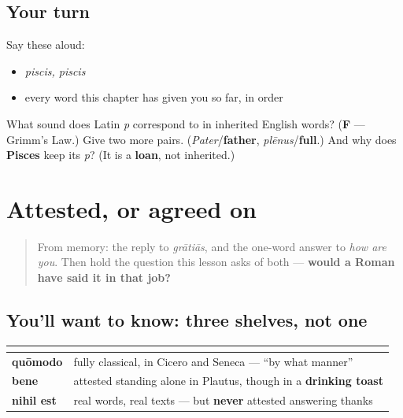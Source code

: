 \subsection*{Your turn}
Say these aloud:

\begin{itemize}
\raggedright
  \item \emph{piscis, piscis}
  \item every word this chapter has given you so far, in order
\end{itemize}

\begin{tcolorbox}[breakable,colback=teal!4,colframe=teal!35!black,title={Before you move on}]
What sound does Latin \emph{p} correspond to in inherited English words? (\textbf{F} — Grimm's Law.) Give two more pairs. (\emph{Pater}/\textbf{father}, \emph{plēnus}/\textbf{full}.) And why does \textbf{Pisces} keep its \emph{p}? (It is a \textbf{loan}, not inherited.)
\end{tcolorbox}
\section[ignōsce mihi · nihil est · quōmodo …]{Attested, or agreed on}

\label{lesson:LA-C47-second-pass-honest-gaps}



\begin{quote}
From memory: the reply to \emph{grātiās}, and the one-word answer to \emph{how are you}. Then hold the question this lesson asks of both — \textbf{would a Roman have said it in that job?}
\end{quote}

\subsection*{You'll want to know: three shelves, not one}
\noindent
\begin{tabularx}{\linewidth}{@{}>{\raggedright\arraybackslash}X>{\raggedright\arraybackslash}X@{}}
\toprule
\textbf{} & \textbf{} \\
\midrule
\textbf{quōmodo} & fully classical, in Cicero and Seneca — \textquotedblleft{}by what manner\textquotedblright{} \\
\textbf{bene} & attested standing alone in Plautus, though in a \textbf{drinking toast} \\
\textbf{nihil est} & real words, real texts — but \textbf{never} attested answering thanks \\
\bottomrule
\end{tabularx}

